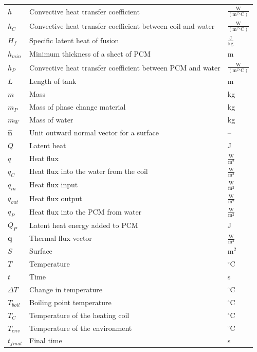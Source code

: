 \documentclass[12pt]{article}
\begin{document}
\begin{longtabu}{l X[l] l}
\\
$h$ & Convective heat transfer coefficient & $\frac{\text{W}}{(\text{m}^{2}{}^{\circ}\text{C})}$
\\
${h_{C}}$ & Convective heat transfer coefficient between coil and water & $\frac{\text{W}}{(\text{m}^{2}{}^{\circ}\text{C})}$
\\
${H_{f}}$ & Specific latent heat of fusion & $\frac{\text{J}}{\text{kg}}$
\\
${h_{min}}$ & Minimum thickness of a sheet of PCM & m
\\
${h_{P}}$ & Convective heat transfer coefficient between PCM and water & $\frac{\text{W}}{(\text{m}^{2}{}^{\circ}\text{C})}$
\\
$L$ & Length of tank & m
\\
$m$ & Mass & kg
\\
${m_{P}}$ & Mass of phase change material & kg
\\
${m_{W}}$ & Mass of water & kg
\\
$\mathbf{\hat{n}}$ & Unit outward normal vector for a surface & --
\\
$Q$ & Latent heat & J
\\
$q$ & Heat flux & $\frac{\text{W}}{\text{m}^{2}}$
\\
${q_{C}}$ & Heat flux into the water from the coil & $\frac{\text{W}}{\text{m}^{2}}$
\\
${q_{in}}$ & Heat flux input & $\frac{\text{W}}{\text{m}^{2}}$
\\
${q_{out}}$ & Heat flux output & $\frac{\text{W}}{\text{m}^{2}}$
\\
${q_{P}}$ & Heat flux into the PCM from water & $\frac{\text{W}}{\text{m}^{2}}$
\\
${Q_{P}}$ & Latent heat energy added to PCM & J
\\
$\mathbf{q}$ & Thermal flux vector & $\frac{\text{W}}{\text{m}^{2}}$
\\
$S$ & Surface & $\text{m}^{2}$
\\
$T$ & Temperature & ${}^{\circ}$C
\\
$t$ & Time & s
\\
$ΔT$ & Change in temperature & ${}^{\circ}$C
\\
${T_{boil}}$ & Boiling point temperature & ${}^{\circ}$C
\\
${T_{C}}$ & Temperature of the heating coil & ${}^{\circ}$C
\\
${T_{env}}$ & Temperature of the environment & ${}^{\circ}$C
\\
${t_{final}}$ & Final time & s
\\

\end{longtabu}
\end{document}
